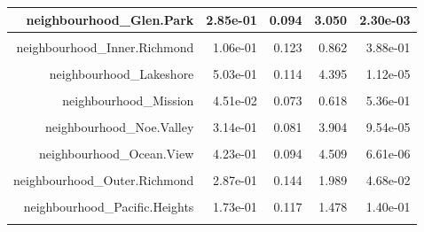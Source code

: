 \documentclass[justified, 11pt]{scrartcl}\usepackage[]{graphicx}\usepackage[]{xcolor}
\newenvironment{knitrout}{}{} %
\begin{document}
\begin{knitrout}
\begin{table}
\begin{tabular}{r|r|r|r|r}
\hline
neighbourhood\_Glen.Park & 2.85e-01 & 0.094 & 3.050 & 2.30e-03\\
\hline
\cellcolor{gray!6}{neighbourhood\_Haight.Ashbury} & \cellcolor{gray!6}{3.06e-01} & \cellcolor{gray!6}{0.099} & \cellcolor{gray!6}{3.083} & \cellcolor{gray!6}{2.05e-03}\\
\hline
neighbourhood\_Inner.Richmond & 1.06e-01 & 0.123 & 0.862 & 3.88e-01\\
\hline
\cellcolor{gray!6}{neighbourhood\_Inner.Sunset} & \cellcolor{gray!6}{1.38e-01} & \cellcolor{gray!6}{0.111} & \cellcolor{gray!6}{1.244} & \cellcolor{gray!6}{2.14e-01}\\
\hline
neighbourhood\_Lakeshore & 5.03e-01 & 0.114 & 4.395 & 1.12e-05\\
\hline
\cellcolor{gray!6}{neighbourhood\_Marina} & \cellcolor{gray!6}{-2.13e-02} & \cellcolor{gray!6}{0.126} & \cellcolor{gray!6}{-0.169} & \cellcolor{gray!6}{8.66e-01}\\
\hline
neighbourhood\_Mission & 4.51e-02 & 0.073 & 0.618 & 5.36e-01\\
\hline
\cellcolor{gray!6}{neighbourhood\_Nob.Hill} & \cellcolor{gray!6}{6.97e-05} & \cellcolor{gray!6}{0.104} & \cellcolor{gray!6}{0.001} & \cellcolor{gray!6}{9.99e-01}\\
\hline
neighbourhood\_Noe.Valley & 3.14e-01 & 0.081 & 3.904 & 9.54e-05\\
\hline
\cellcolor{gray!6}{neighbourhood\_North.Beach} & \cellcolor{gray!6}{1.23e-01} & \cellcolor{gray!6}{0.120} & \cellcolor{gray!6}{1.025} & \cellcolor{gray!6}{3.06e-01}\\
\hline
neighbourhood\_Ocean.View & 4.23e-01 & 0.094 & 4.509 & 6.61e-06\\
\hline
\cellcolor{gray!6}{neighbourhood\_Outer.Mission} & \cellcolor{gray!6}{1.56e-01} & \cellcolor{gray!6}{0.085} & \cellcolor{gray!6}{1.830} & \cellcolor{gray!6}{6.73e-02}\\
\hline
neighbourhood\_Outer.Richmond & 2.87e-01 & 0.144 & 1.989 & 4.68e-02\\
\hline
\cellcolor{gray!6}{neighbourhood\_Outer.Sunset} & \cellcolor{gray!6}{2.71e-01} & \cellcolor{gray!6}{0.126} & \cellcolor{gray!6}{2.152} & \cellcolor{gray!6}{3.14e-02}\\
\hline
neighbourhood\_Pacific.Heights & 1.73e-01 & 0.117 & 1.478 & 1.40e-01\\
\hline
\cellcolor{gray!6}{neighbourhood\_Parkside} & \cellcolor{gray!6}{2.94e-01} & \cellcolor{gray!6}{0.120} & \cellcolor{gray!6}{2.453} & \cellcolor{gray!6}{1.42e-02}\\

\end{tabular}
\end{table}
\end{knitrout}
\end{document}
